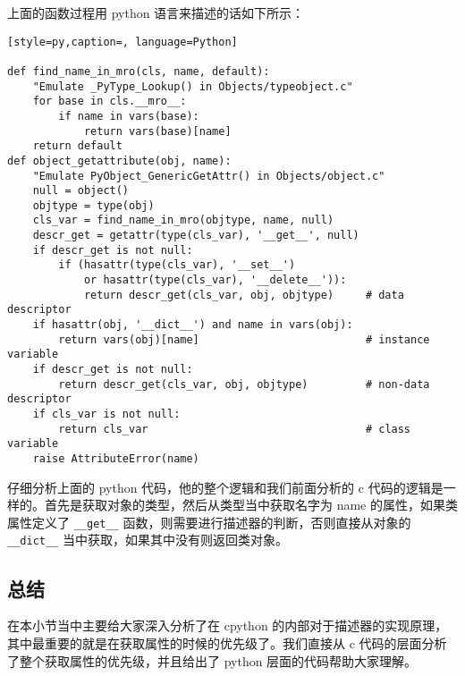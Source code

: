 上面的函数过程用 python 语言来描述的话如下所示：
\begin{lstlisting}[style=py,caption=, language=Python]

def find_name_in_mro(cls, name, default):
    "Emulate _PyType_Lookup() in Objects/typeobject.c"
    for base in cls.__mro__:
        if name in vars(base):
            return vars(base)[name]
    return default
def object_getattribute(obj, name):
    "Emulate PyObject_GenericGetAttr() in Objects/object.c"
    null = object()
    objtype = type(obj)
    cls_var = find_name_in_mro(objtype, name, null)
    descr_get = getattr(type(cls_var), '__get__', null)
    if descr_get is not null:
        if (hasattr(type(cls_var), '__set__')
            or hasattr(type(cls_var), '__delete__')):
            return descr_get(cls_var, obj, objtype)     # data descriptor
    if hasattr(obj, '__dict__') and name in vars(obj):
        return vars(obj)[name]                          # instance variable
    if descr_get is not null:
        return descr_get(cls_var, obj, objtype)         # non-data descriptor
    if cls_var is not null:
        return cls_var                                  # class variable
    raise AttributeError(name)
\end{lstlisting}
仔细分析上面的 python 代码，他的整个逻辑和我们前面分析的 c 代码的逻辑是一样的。首先是获取对象的类型，然后从类型当中获取名字为 name 的属性，如果类属性定义了 \verb|__get__| 函数，则需要进行描述器的判断，否则直接从对象的 \verb|__dict__| 当中获取，如果其中没有则返回类对象。
\subsection{总结}
在本小节当中主要给大家深入分析了在 cpython 的内部对于描述器的实现原理，其中最重要的就是在获取属性的时候的优先级了。我们直接从 c 代码的层面分析了整个获取属性的优先级，并且给出了 python 层面的代码帮助大家理解。
